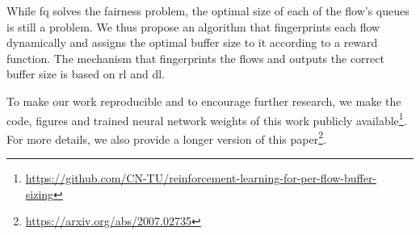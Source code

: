 \documentclass[conference]{IEEEtran}
\begin{document}
While \gls{fq} solves the fairness problem, the optimal size of each of the flow's queues is still a problem. We thus propose an algorithm that fingerprints each flow dynamically and assigns the optimal buffer size to it according to a reward function. The mechanism that fingerprints the flows and outputs the correct buffer size is based on \gls{rl} and \gls{dl}. 
 


To make our work reproducible and to encourage further research, we make the code, figures and trained neural network weights of this work publicly available\footnote{\scriptsize\url{https://github.com/CN-TU/reinforcement-learning-for-per-flow-buffer-sizing}}. For more details, we also provide a longer version of this paper\footnote{\url{https://arxiv.org/abs/2007.02735}}.
\end{document}
